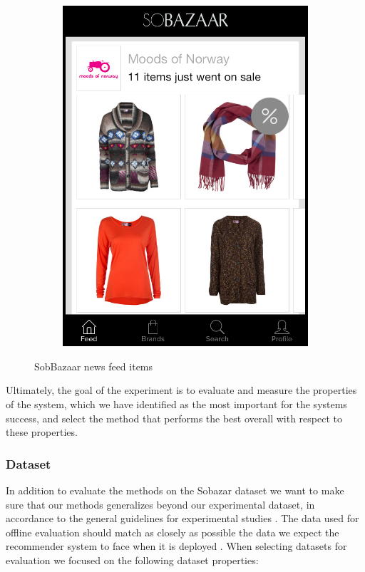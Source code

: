 \begin{figure}[H]
\begin{subfigure}[b]{.45\linewidth}
			\includegraphics[scale=0.25]{image/SoBazaarsale.png} 
		\end{subfigure}
		\caption[Sobazaar News Feed - Version 0.5.1]{SobBazaar news feed items}
		\label{figure:sobazarfeed}
\end{figure}

Ultimately, the goal of the experiment is to evaluate and measure the properties
of the system, which we have identified as the most important for the systems success,
and select the method that performs the best overall with respect to these properties.

\subsubsection{Dataset}

In addition to evaluate the methods on the Sobazar dataset we want to make sure that our
methods generalizes beyond our experimental dataset, in accordance to the general guidelines
for experimental studies \cite{Shani2011}. The data used for offline evaluation should match
as closely as possible the data we expect the recommender system to face when it is
deployed \cite{Gunawardana2009}. When selecting datasets for evaluation we focused on the
following dataset properties:

